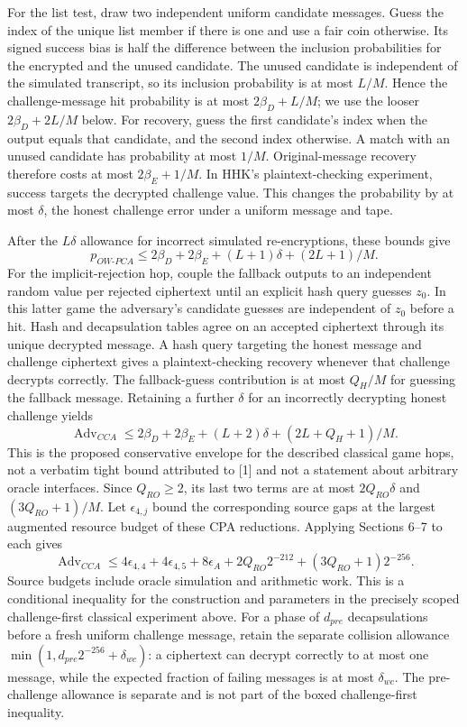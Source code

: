 \documentclass[
  10pt,
  a4paper,
]{article}
\begin{document}
For the list test, draw two independent uniform candidate messages.
Guess the index of the unique list member if there is one and use a fair
coin otherwise. Its signed success bias is half the difference between
the inclusion probabilities for the encrypted and the unused candidate.
The unused candidate is independent of the simulated transcript, so its
inclusion probability is at most \(L/M\). Hence the challenge-message
hit probability is at most \(2\beta_D+L/M\); we use the looser
\(2\beta_D+2L/M\) below. For recovery, guess the first candidate's index
when the output equals that candidate, and the second index otherwise. A
match with an unused candidate has probability at most \(1/M\).
Original-message recovery therefore costs at most \(2\beta_E+1/M\). In
HHK's plaintext-checking experiment, success targets the decrypted
challenge value. This changes the probability by at most \(\delta\), the
honest challenge error under a uniform message and tape.

After the \(L\delta\) allowance for incorrect simulated re-encryptions,
these bounds give \[
p_{OW\text{-}PCA}\le
2\beta_D+2\beta_E+(L+1)\delta+(2L+1)/M.
\] For the implicit-rejection hop, couple the fallback outputs to an
independent random value per rejected ciphertext until an explicit hash
query guesses \(z_0\). In this latter game the adversary's candidate
guesses are independent of \(z_0\) before a hit. Hash and decapsulation
tables agree on an accepted ciphertext through its unique decrypted
message. A hash query targeting the honest message and challenge
ciphertext gives a plaintext-checking recovery whenever that challenge
decrypts correctly. The fallback-guess contribution is at most \(Q_H/M\)
for guessing the fallback message. Retaining a further \(\delta\) for an
incorrectly decrypting honest challenge yields \[
\operatorname{Adv}_{CCA}\le
2\beta_D+2\beta_E+(L+2)\delta+(2L+Q_H+1)/M.
\] This is the proposed conservative envelope for the described
classical game hops, not a verbatim tight bound attributed to {[}1{]}
and not a statement about arbitrary oracle interfaces. Since
\(Q_{RO}\ge2\), its last two terms are at most \(2Q_{RO}\delta\) and
\((3Q_{RO}+1)/M\). Let \(\epsilon_{4,j}\) bound the corresponding source
gaps at the largest augmented resource budget of these CPA reductions.
Applying Sections 6--7 to each gives \[
\boxed{
\operatorname{Adv}_{CCA}\le
4\epsilon_{4,4}+4\epsilon_{4,5}+8\epsilon_A
+2Q_{RO}2^{-212}+(3Q_{RO}+1)2^{-256}.
}
\] Source budgets include oracle simulation and arithmetic work. This is
a conditional inequality for the construction and parameters in the
precisely scoped challenge-first classical experiment above. For a phase
of \(d_{pre}\) decapsulations before a fresh uniform challenge message,
retain the separate collision allowance
\(\min(1,d_{pre}2^{-256}+\delta_{wc})\): a ciphertext can decrypt
correctly to at most one message, while the expected fraction of failing
messages is at most \(\delta_{wc}\). The pre-challenge allowance is
separate and is not part of the boxed challenge-first inequality.
\end{document}
